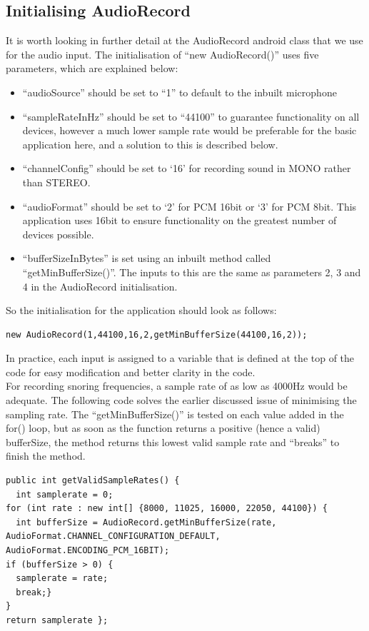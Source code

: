 \subsection{Initialising AudioRecord}
It is worth looking in further detail at the AudioRecord android class that we use for the audio input. The initialisation of ``new AudioRecord()'' uses five parameters, which are explained below:
\begin{itemize}
\item ``audioSource'' should be set to ``1'' to default to the inbuilt microphone
\item ``sampleRateInHz'' should be set to ``44100'' to guarantee functionality on all devices, however a much lower sample rate would be preferable for the basic application here, and a solution to this is described below.
\item ``channelConfig'' should be set to `16' for recording sound in MONO rather than STEREO. 
\item ``audioFormat'' should be set to `2' for PCM 16bit or `3' for PCM 8bit. This application uses 16bit to ensure functionality on the greatest number of devices possible.
\item ``bufferSizeInBytes'' is set using an inbuilt method called ``getMinBufferSize()''. The inputs to this are the same as parameters 2, 3 and 4 in the AudioRecord initialisation.
\end{itemize}
So the initialisation for the application should look as follows:
\begin{lstlisting}
new AudioRecord(1,44100,16,2,getMinBufferSize(44100,16,2));
\end{lstlisting}
In practice, each input is assigned to a variable that is defined at the top of the code for easy modification and better clarity in the code.
\\ For recording snoring frequencies, a sample rate of as low as 4000Hz would be adequate. The following code solves the earlier discussed issue of minimising the sampling rate. The ``getMinBufferSize()'' is tested on each value added in the for() loop, but as soon as the function returns a positive (hence a valid) bufferSize, the method returns this lowest valid sample rate and ``breaks'' to finish the method.
\begin{lstlisting}
public int getValidSampleRates() {
  int samplerate = 0;
for (int rate : new int[] {8000, 11025, 16000, 22050, 44100}) {
  int bufferSize = AudioRecord.getMinBufferSize(rate, AudioFormat.CHANNEL_CONFIGURATION_DEFAULT, AudioFormat.ENCODING_PCM_16BIT);
if (bufferSize > 0) {
  samplerate = rate;
  break;}
}
return samplerate };
\end{lstlisting}
